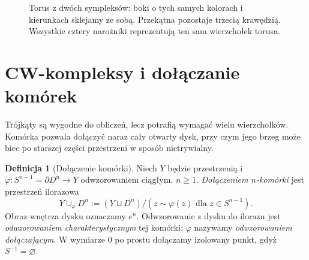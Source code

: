 \documentclass[11pt,a4paper,oneside]{report}
\theoremstyle{plain}
\theoremstyle{definition}
\newtheorem{definicja}[twierdzenie]{Definicja}
\theoremstyle{remark}
\begin{document}
\begin{figure}[!htbp]
\centering
{}
\caption{Torus z dwóch sympleksów: boki o tych samych
kolorach i kierunkach sklejamy ze sobą. Przekątna
pozostaje trzecią krawędzią. Wszystkie cztery narożniki
reprezentują ten sam wierzchołek torusa.}
\label{fig:delta-torus}
\end{figure}

\section{CW-kompleksy i dołączanie komórek}
\label{sec:cw-kompleksy}

Trójkąty są wygodne do obliczeń, lecz
potrafią wymagać wielu wierzchołków.
Komórka pozwala dołączyć naraz cały
otwarty dysk, przy czym jego brzeg
może biec po starszej części przestrzeni
w sposób nietrywialny.

\begin{definicja}[Dołączenie komórki]
\label{def:dolaczenie-komorki}
Niech $Y$ będzie przestrzenią i
$\varphi:S^{n-1}=\partial D^n\to Y$
odwzorowaniem ciągłym, $n\geq1$.
\emph{Dołączeniem $n$-komórki} jest
przestrzeń ilorazowa
\[
 Y\cup_\varphi D^n
 :=(Y\sqcup D^n)/(z\sim\varphi(z)
 \text{ dla }z\in S^{n-1}).
\]
Obraz wnętrza dysku oznaczamy $e^n$.
Odwzorowanie z dysku do ilorazu jest
\emph{odwzorowaniem charakterystycznym}
tej komórki; $\varphi$ nazywamy
\emph{odwzorowaniem dołączającym}.
W wymiarze $0$ po prostu dołączamy
izolowany punkt, gdyż
$S^{-1}=\varnothing$.
\end{definicja}
\end{document}
